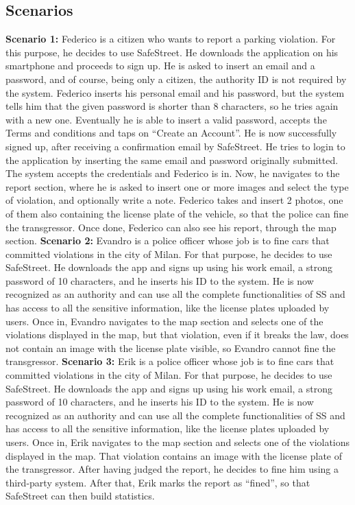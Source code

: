 \documentclass[../RASD.tex]{subfiles}
\begin{document}
            \subsection{Scenarios}\label{subsec:scenarios}
                \textbf{Scenario 1:} Federico is a citizen who wants to report a parking violation. For this purpose, he decides to use SafeStreet. He downloads the application on his smartphone and proceeds to sign up. He is asked to insert an email and a password, and of course, being only a citizen, the authority ID is not required by the system. Federico inserts his personal email and his password, but the system tells him that the given password is shorter than 8 characters, so he tries again with a new one. Eventually he is able to insert a valid password, accepts the Terms and conditions and taps on “Create an Account”. He is now successfully signed up, after receiving a confirmation email by SafeStreet. He tries to login to the application by inserting the same email and password originally submitted. The system accepts the credentials and Federico is in. Now, he navigates to the report section, where he is asked to insert one or more images and select the type of violation, and optionally write a note. Federico takes and insert 2 photos, one of them also containing the license plate of the vehicle, so that the police can fine the transgressor. Once done, Federico can also see his report, through the map section.
    \newline
    \newline
                \textbf{Scenario 2:} Evandro is a police officer whose job is to fine cars that committed violations in the city of Milan. For that purpose, he decides to use SafeStreet. He downloads the app and signs up using his work email, a strong password of 10 characters, and he inserts his ID to the system. He is now recognized as an authority and can use all the complete functionalities of SS and has access to all the sensitive information, like the license plates uploaded by users. Once in, Evandro navigates to the map section and selects one of the violations displayed in the map, but that violation, even if it breaks the law, does not contain an image with the license plate visible, so Evandro cannot fine the transgressor.
    \newline
    \newline
                \textbf{Scenario 3:} Erik is a police officer whose job is to fine cars that committed violations in the city of Milan. For that purpose, he decides to use SafeStreet. He downloads the app and signs up using his work email, a strong password of 10 characters, and he inserts his ID to the system. He is now recognized as an authority and can use all the complete functionalities of SS and has access to all the sensitive information, like the license plates uploaded by users. Once in, Erik navigates to the map section and selects one of the violations displayed in the map. That violation contains an image with the license plate of the transgressor. After having judged the report, he decides to fine him using a third-party system. After that, Erik marks the report as “fined”, so that SafeStreet can then build statistics.
\end{document}
